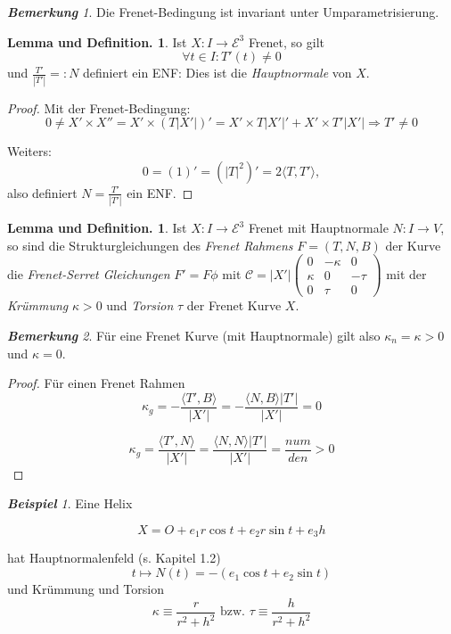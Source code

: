 \documentclass[a4paper,oneside,11pt,DIV=12,parskip=half]{scrartcl}
\newcommand{\E}{\mathcal E}
\theoremstyle{plain}
\theoremstyle{definition}
\newtheorem{remark, definition}[theorem]{Bemerkung und Definition.}
\newtheorem{lemma, definition}[theorem]{Lemma und Definition.}
\theoremstyle{remark}
\newtheorem*{remark}{\textbf{Bemerkung}}
\newtheorem*{example}{\textbf{Beispiel}}
\newtheorem*{remark, example}{\textbf{Bemerkung und Beispiel}}
\begin{document}
\begin{remark}
	Die Frenet-Bedingung ist invariant unter Umparametrisierung.
\end{remark}

\begin{lemma, definition}
	Ist $X: I \rightarrow \E^3$ Frenet, so gilt \[ \forall t \in I : T'(t) \not = 0 \] und $\frac{T'}{|T'|} =: N$ definiert ein ENF: Dies ist die \emph{Hauptnormale} von $X$.
\end{lemma, definition}

\begin{proof}
	Mit der Frenet-Bedingung:
	\[0 \not = X' \times X''= X' \times (T|X'|)' = X' \times T|X'|' + X'\times T'|X'| \Rightarrow T' \not = 0 \]
	
	Weiters: \[ 0 = (1)' = (|T|^2)' = 2\langle T,T' \rangle, \]
	also definiert $N = \frac{T'}{|T'|}$ ein ENF.
\end{proof}

\begin{lemma, definition}
	Ist $X: I \rightarrow \E^3$ Frenet mit Hauptnormale $N: I \rightarrow V$, so sind die Strukturgleichungen des \emph{Frenet Rahmens} $F = (T,N,B)$ der Kurve die \emph{Frenet-Serret Gleichungen} $F' = F\phi$ mit $\mathcal{C} = |X'|\begin{pmatrix}
	0 & - \kappa & 0\\
	\kappa & 0 & - \tau \\
	0 & \tau & 0
	\end{pmatrix}$
	 mit der \emph{Krümmung} $\kappa > 0$ und \emph{Torsion} $\tau$ der Frenet Kurve $X$.
\end{lemma, definition}

\begin{remark}
	Für eine Frenet Kurve (mit Hauptnormale) gilt also $\kappa_n = \kappa > 0$ und $\kappa = 0$.
\end{remark}

\begin{proof}
	Für einen Frenet Rahmen \[ \kappa_g = - \frac{\langle T', B \rangle}{|X'|} = - \frac{\langle N, B \rangle |T'|}{|X'|} = 0 \]
	
	\[ \kappa_g = \frac{\langle T', N \rangle}{|X'|} = \frac{\langle N, N \rangle |T'|}{|X'|} = \frac{num}{den} >0 \]
\end{proof}

\begin{example}
	Eine Helix
	
	\[ X = O + e_1 r \cos t + e_2 r \sin t + e_3 h \]
	
	hat Hauptnormalenfeld (s. Kapitel 1.2) \[ t \mapsto N(t) = - (e_1 \cos t + e_2 \sin t) \] und Krümmung und Torsion 
	\[ \kappa \equiv \frac{r}{r^2 +h^2} \text{ bzw. } \tau \equiv \frac{h}{r^2+h^2}  \]
\end{example}
\end{document}
